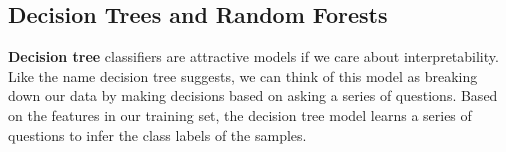 \documentclass{article}
\begin{document}
\subsection{Decision Trees and Random Forests}

\textbf{Decision tree} classifiers are attractive models if we care about interpretability. Like the name decision tree suggests, we can think of this model as breaking down our data by making decisions based on asking a series of questions.
Based on the features in our training set, the decision tree model learns a series of questions to infer the class labels of the samples. 

\end{document}
